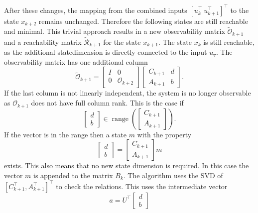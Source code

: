 \documentclass[numbers=noenddot,doctype=mastersthesis,BCOR=15mm,biblatex]{ldvbook}%
\DeclareMathOperator{\range}{range}
\newcommand{\R}{\mathcal{R}} %
\newcommand{\Ob}{\mathcal{O}} %
\newcommand{\eye}{I} %
\newcommand{\m}{\triangledown} %
\begin{document}
After these changes, the mapping from the combined inputs $[u_k^\top \: u_{k+1}^\top]^\top$
to the state $x_{k+2}$ remains unchanged. Therefore the following states are still reachable and minimal.
This trivial approach results in a new observability matrix $\tilde{\Ob}_{k+1}$ and a reachability matrix $\tilde{\R}_{k+1}$ for the state $x_{k+1}$.
The state $x_k$ is still reachable, as the additional statedimension is directly connected to the input $u_\m$.
The observability matrix has one additional column
\begin{equation}\label{eq:strucure_mover}
	\tilde{\Ob}_{k+1}
	=
	\begin{bmatrix}
	\eye & 0\\ 0 &\Ob_{k+2}
	\end{bmatrix}
	\begin{bmatrix}
	C_{k+1} & d\\
	A_{k+1} & b
	\end{bmatrix}
	.
\end{equation}
If the last column is not linearly independent, the system is no longer observable as $\Ob_{k+1}$ does not have full column rank.
This is the case if
\begin{equation}
	\begin{bmatrix}
	d\\b
	\end{bmatrix}
	\in
	\range\left(
	\begin{bmatrix}
	C_{k+1}\\A_{k+1}
	\end{bmatrix}\right).
\end{equation}
If the vector is in the range then a state $m$ with the property
\begin{equation}
	\begin{bmatrix}
	d\\b
	\end{bmatrix}
	=
	\begin{bmatrix}
	C_{k+1}\\A_{k+1}
	\end{bmatrix}
	m
\end{equation}
exists.
This also means that no new state dimension is required.
In this case the vector $m$ is appended to the matrix $B_{k}$.
The algorithm uses the SVD of $[C_{k+1}^\top,A_{k+1}^\top]^\top$ to check the relations.
This uses the intermediate vector 
\begin{equation}
	a = U^\top 	
	\begin{bmatrix}
	d\\b
	\end{bmatrix}
\end{equation} 
\end{document}
